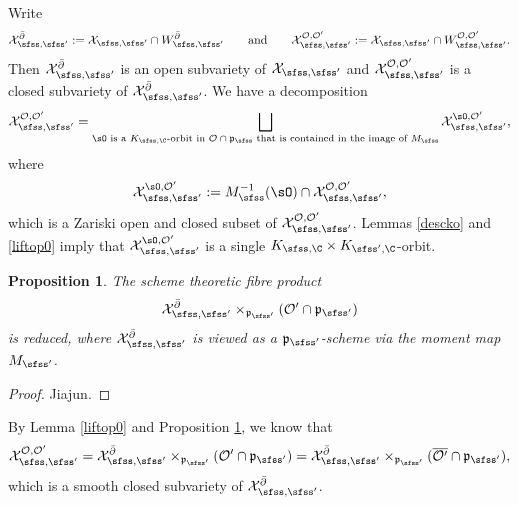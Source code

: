 \documentclass[12pt,a4paper]{amsart}
\newcommand{\CO}{{\mathcal {O}}}
\newcommand{\CX}{{\mathcal {X}}}
\newcommand{\p}{\mathfrak p}
\newcommand{\be}{\begin {equation}}
\newcommand{\ee}{\end {equation}}
\numberwithin{equation}{section}
\newtheorem{prop}[thm]{Proposition}
\theoremstyle{remark}
\begin{document}
Write 
\[
    \CX_{\sfss, \sfss'}^{\bar \partial}:=\CX_{\sfss, \sfss'} \cap W_{\sfss, \sfss'}^{\bar \partial}\qquad\textrm{and}\qquad \CX_{\sfss, \sfss'}^{\CO, \CO'}:=\CX_{\sfss, \sfss'} \cap W_{\sfss, \sfss'}^{\CO, \CO'}.
   \]
Then  $ \CX_{\sfss, \sfss'}^{\bar \partial}$ is an open subvariety of $ \CX_{\sfss, \sfss'}$ and  $\CX_{\sfss, \sfss'}^{\CO, \CO'}$ is a  closed subvariety of  $\CX_{\sfss, \sfss'}^{\bar \partial}$. We have a decomposition
 \[
   \CX_{\sfss, \sfss'}^{\CO, \CO'}=\bigsqcup_{\sO\textrm{ is a   $K_{\sfss, \C}$-orbit in $ \CO\cap \p_\sfss$ that is contained in the image of $M_\sfss$}}  \CX_{\sfss, \sfss'}^{\sO, \CO'},
 \]
 where 
 \[
   \CX_{\sfss, \sfss'}^{\sO, \CO'}:=M_\sfss^{-1}(\sO)\cap \CX_{\sfss, \sfss'}^{\CO, \CO'}, 
 \]
 which is a Zariski open and closed subset of $\CX_{\sfss, \sfss'}^{\CO, \CO'}$. Lemmas \ref{descko} and \ref{liftop0} imply that $ \CX_{\sfss, \sfss'}^{\sO, \CO'}$ is a single $K_{\sfss, \C}\times K_{\sfss',\C}$-orbit. 
 

\begin{prop}\label{propreduced}
 The scheme theoretic  fibre product 
\[
\CX_{\sfss, \sfss'}^{\bar \partial}\times_{\p_{\sfss'}} ({\CO'}\cap \p_{\sfss'})
\]
is reduced, where $\CX_{\sfss, \sfss'}^{\bar \partial}$ is viewed as a $\p_{\sfss'}$-scheme via the moment map $M_{\sfss'}$. 
\end{prop}
\begin{proof}
Jiajun.
\end{proof}
By Lemma \ref{liftop0} and Proposition \ref{propreduced}, we know that 
\be\label{cxee}
 \CX_{\sfss, \sfss'}^{\CO, \CO'}=\CX_{\sfss, \sfss'}^{\bar \partial}\times_{\p_{\sfss'}} ({\CO'}\cap \p_{\sfss'})=\CX_{\sfss, \sfss'}^{\bar \partial}\times_{\p_{\sfss'}} ({\overline{\CO'}}\cap \p_{\sfss'}),
 \ee
 which  is a smooth closed subvariety of $\CX_{\sfss, \sfss'}^{\bar \partial}$. 
\end{document}
